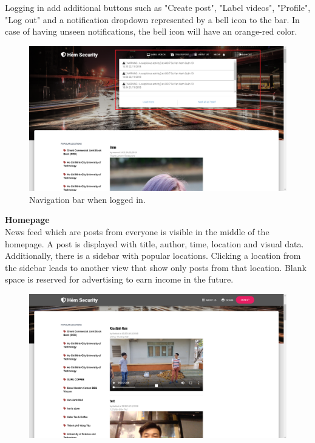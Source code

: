 Logging in add additional buttons such as "Create post", "Label videos",  "Profile", "Log out" and a notification dropdown represented by a bell icon to the bar. In case of having unseen notifications, the bell icon will have an orange-red color.
\begin{center}
    \begin{figure}[H]
    \centering
    \includegraphics[width=1\columnwidth]{images/chap4/header.png}
    \caption{Navigation bar when logged in.}
    \end{figure}
\end{center}
\textbf{Homepage}
\\
News feed which are posts from everyone is visible in the middle of the homepage. A post is displayed with title, author, time, location and visual data. Additionally, there is a sidebar with popular locations. Clicking a location from the sidebar leads to another view that show only posts from that location. Blank space is reserved for advertising to earn income in the future.
\begin{center}
    \begin{figure}[H]
    \centering
    \includegraphics[width=1\columnwidth]{images/chap4/homepage.png}
    \end{figure}
\end{center}

